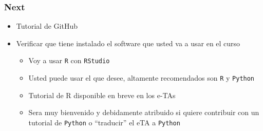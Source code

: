 \documentclass[
  shownotes,
  xcolor={svgnames},
  hyperref={colorlinks,citecolor=DarkBlue,linkcolor=DarkRed,urlcolor=DarkBlue}
  ]{beamer}
\begin{document}
\begin{frame}
\frametitle{Next}
  
  \begin{itemize} 
  \item Tutorial de GitHub
  \bigskip
  \item Verificar que tiene instalado el software que usted va a usar en el curso 
  \medskip
    \begin{itemize} 
      \item Voy a usar \texttt{R} con \texttt{RStudio}
      \medskip
      \item Usted puede usar el que desee, altamente recomendados son \texttt{R} y \texttt{Python} 
      \medskip
      \item Tutorial de R disponible en breve en los e-TAs
      \medskip
      \item Sera muy bienvenido y debidamente atribuido si quiere contribuir con un tutorial de \texttt{Python} o ``traducir'' el eTA a \texttt{Python} 
    \end{itemize}
  \end{itemize}


\end{frame}
\end{document}
